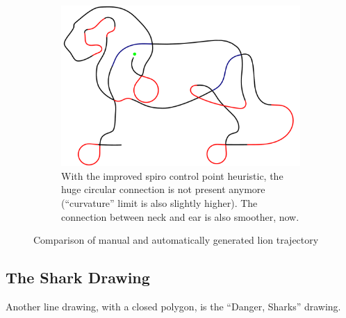 \begin{figure}[h]
\begin{subfigure}[t]{0.8\textwidth}
	\includegraphics[width=\textwidth]{images/results/lion/lion_new_heuristic2.pdf}
	\caption{With the improved spiro control point heuristic, the huge circular connection is not present anymore (\enquote{curvature} limit is also slightly higher). The connection between neck and ear is also smoother, now.}
\end{subfigure}

\caption{Comparison of manual and automatically generated lion trajectory}
\end{figure}

\subsection{The Shark Drawing}

Another line drawing, with a closed polygon, is the \enquote{Danger, Sharks} drawing.

